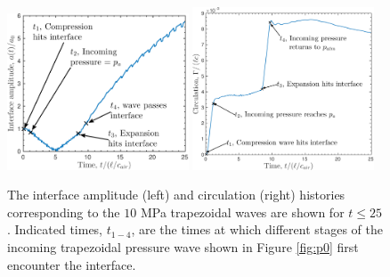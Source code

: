 \begin{figure}[h] 
  \centering
  \includegraphics[width=0.48\textwidth]{./figs/lung_figs/trapz10_intf_schematic}
  \includegraphics[width=0.48\textwidth]{./figs/lung_figs/trapz10_circ_schematic}
  \caption[The interface amplitude and circulation histories for the $10$ MPa trapezoidal wave]{The interface amplitude (left) and circulation (right)
    histories corresponding to the $10$ MPa trapezoidal waves are
    shown for $t\leq25$. Indicated times, $t_{1-4}$, are the times at
    which different stages of the incoming trapezoidal pressure wave
    shown in Figure \ref{fig:p0} first encounter the interface.}
  \label{fig:trapz10_circ_interface}
\end{figure}

